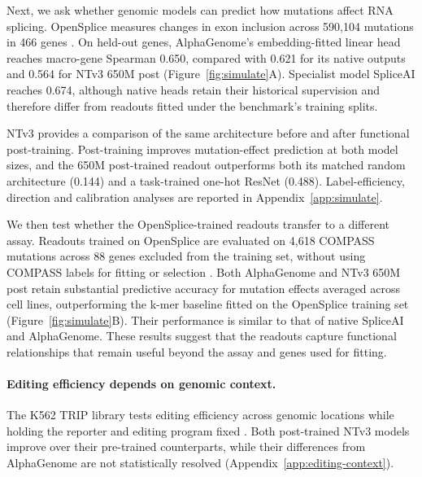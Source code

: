 Next, we ask whether genomic models can predict how mutations affect
RNA splicing. OpenSplice measures changes in exon inclusion across
590,104 mutations in 466 genes \citep{quarantani2026opensplicepaper}.
On held-out genes, AlphaGenome's embedding-fitted linear head reaches macro-gene
Spearman 0.650, compared with 0.621 for its native outputs and
0.564 for NTv3 650M post (Figure~\ref{fig:simulate}A).
Specialist model SpliceAI reaches 0.674, although native heads retain their historical supervision and therefore differ from readouts fitted
under the benchmark's training splits.

NTv3 provides a comparison of the same architecture before and after
functional post-training. Post-training improves mutation-effect
prediction at both model sizes, and the 650M post-trained readout
outperforms both its matched random architecture (0.144) and a
task-trained one-hot ResNet (0.488). Label-efficiency, direction and calibration analyses are
reported in Appendix~\ref{app:simulate}.

We then test whether the OpenSplice-trained readouts transfer to a different assay. Readouts trained on OpenSplice are evaluated on 4,618 COMPASS mutations across 88 genes excluded from the training set, without using COMPASS labels for fitting or selection \citep{koplik2025compass}.
Both AlphaGenome and NTv3 650M post retain substantial predictive accuracy for mutation effects averaged across cell lines, outperforming the k-mer baseline fitted on the OpenSplice training set
(Figure~\ref{fig:simulate}B). Their performance is similar to that of native SpliceAI and AlphaGenome. These results suggest that the readouts capture functional relationships that remain useful beyond the assay and genes used for fitting.


\paragraph{Editing efficiency depends on genomic context.}

The K562 TRIP library tests editing efficiency across genomic
locations while holding the reporter and editing program fixed
\citep{mathis2025pridict2}. Both post-trained NTv3 models improve over
their pre-trained counterparts, while their differences from AlphaGenome
are not statistically resolved (Appendix~\ref{app:editing-context}).


